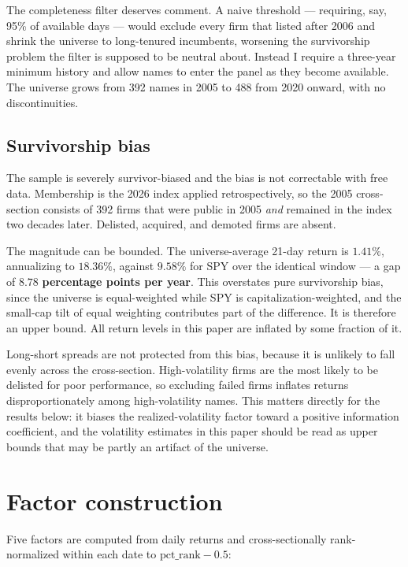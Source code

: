 \documentclass[11pt]{article}
\begin{document}
The completeness filter deserves comment. A naive threshold --- requiring, say,
95\% of available days --- would exclude every firm that listed after 2006 and
shrink the universe to long-tenured incumbents, worsening the survivorship
problem the filter is supposed to be neutral about. Instead I require a
three-year minimum history and allow names to enter the panel as they become
available. The universe grows from 392 names in 2005 to 488 from 2020 onward,
with no discontinuities.

\subsection{Survivorship bias}
\label{sec:survivorship}

The sample is severely survivor-biased and the bias is not correctable with free
data. Membership is the 2026 index applied retrospectively, so the 2005
cross-section consists of 392 firms that were public in 2005 \emph{and} remained
in the index two decades later. Delisted, acquired, and demoted firms are absent.

The magnitude can be bounded. The universe-average 21-day return is $1.41\%$,
annualizing to $18.36\%$, against $9.58\%$ for SPY over the identical window ---
a gap of $\mathbf{8.78}$ \textbf{percentage points per year}. This overstates
pure survivorship bias, since the universe is equal-weighted while SPY is
capitalization-weighted, and the small-cap tilt of equal weighting contributes
part of the difference. It is therefore an upper bound. All return levels in
this paper are inflated by some fraction of it.

Long-short spreads are not protected from this bias, because it is unlikely to
fall evenly across the cross-section. High-volatility firms are the most likely
to be delisted for poor performance, so excluding failed firms inflates returns
disproportionately among high-volatility names. This matters directly for the
results below: it biases the realized-volatility factor toward a positive
information coefficient, and the volatility estimates in this paper should be
read as upper bounds that may be partly an artifact of the universe.

\section{Factor construction}

Five factors are computed from daily returns and cross-sectionally
rank-normalized within each date to $\mathrm{pct\_rank} - 0.5$:
\end{document}
